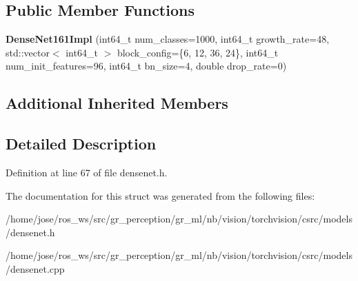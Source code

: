 \subsection*{Public Member Functions}
\begin{DoxyCompactItemize}
\item 
\mbox{\label{structvision_1_1models_1_1DenseNet161Impl_ad53edd7150d7d9354372b19e8cac5753}} 
{\bfseries Dense\+Net161\+Impl} (int64\+\_\+t num\+\_\+classes=1000, int64\+\_\+t growth\+\_\+rate=48, std\+::vector$<$ int64\+\_\+t $>$ block\+\_\+config=\{6, 12, 36, 24\}, int64\+\_\+t num\+\_\+init\+\_\+features=96, int64\+\_\+t bn\+\_\+size=4, double drop\+\_\+rate=0)
\end{DoxyCompactItemize}
\subsection*{Additional Inherited Members}


\subsection{Detailed Description}


Definition at line 67 of file densenet.\+h.



The documentation for this struct was generated from the following files\+:\begin{DoxyCompactItemize}
\item 
/home/jose/ros\+\_\+ws/src/gr\+\_\+perception/gr\+\_\+ml/nb/vision/torchvision/csrc/models/densenet.\+h\item 
/home/jose/ros\+\_\+ws/src/gr\+\_\+perception/gr\+\_\+ml/nb/vision/torchvision/csrc/models/densenet.\+cpp\end{DoxyCompactItemize}
